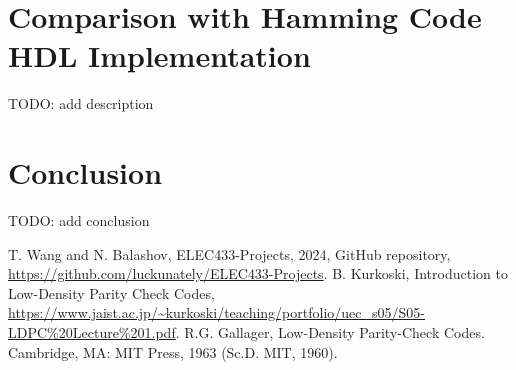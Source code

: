 \documentclass[conference]{IEEEtran}
\begin{document}
\section{Comparison with Hamming Code HDL Implementation}
TODO: add description

\section{Conclusion}
TODO: add conclusion

\begin{thebibliography}{00}
   T. Wang and N. Balashov, ELEC433-Projects, 2024, GitHub repository, \url{https://github.com/luckunately/ELEC433-Projects}.
 B. Kurkoski, Introduction to Low-Density Parity Check Codes, \url{https://www.jaist.ac.jp/~kurkoski/teaching/portfolio/uec_s05/S05-LDPC%20Lecture%201.pdf}.
 R.G. Gallager, Low-Density Parity-Check Codes. Cambridge, MA: MIT Press, 1963 (Sc.D. MIT, 1960).
\end{thebibliography}
\end{document}
